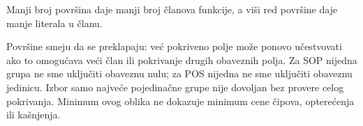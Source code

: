 
Manji broj površina daje manji broj članova funkcije, a viši red površine daje manje literala u članu.

Površine smeju da se preklapaju: već pokriveno polje može ponovo učestvovati ako to omogućava veći član ili pokrivanje drugih obaveznih polja. Za SOP nijedna grupa ne sme uključiti obaveznu nulu; za POS nijedna ne sme uključiti obaveznu jedinicu. Izbor samo najveće pojedinačne grupe nije dovoljan bez provere celog pokrivanja. Minimum ovog oblika ne dokazuje minimum cene čipova, opterećenja ili kašnjenja.
